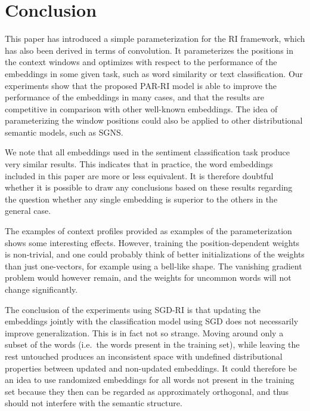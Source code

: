 \documentclass[11pt]{article}
\begin{document}
\section{Conclusion}

This paper has introduced a simple parameterization for the RI framework, which has also been derived in terms of convolution. It parameterizes the positions in the context windows and optimizes with respect to the performance of the embeddings in some given task, such as word similarity or text classification. Our experiments show that the proposed PAR-RI model is able to improve the performance of the embeddings in many cases, and that the results are competitive in comparison with other well-known embeddings. The idea of parameterizing the window positions could also be applied to other distributional semantic models, such as SGNS. 

We note that all embeddings used in the sentiment classification task produce very similar results. This indicates that in practice, the word embeddings included in this paper are more or less equivalent. It is therefore doubtful whether it is possible to draw any conclusions based on these results regarding the question whether any single embedding is superior to the others in the general case.

The examples of context profiles provided as examples of the parameterization shows some interesting effects. However, training the position-dependent weights is non-trivial, and one could probably think of better initializations of the weights than just one-vectors, for example using a bell-like shape. The vanishing gradient problem would however remain, and the weights for uncommon words will not change significantly.

The conclusion of the experiments using SGD-RI is that updating the embeddings jointly with the classification model using SGD does not necessarily improve generalization. This is in fact not so strange. Moving around only a subset of the words (i.e.~the words present in the training set), while leaving the rest untouched produces an inconsistent space with undefined distributional properties between updated and non-updated embeddings. It could therefore be an idea to use randomized embeddings for all words not present in the training set because they then can be regarded as approximately orthogonal, and thus should not interfere with the semantic structure.

\end{document}
